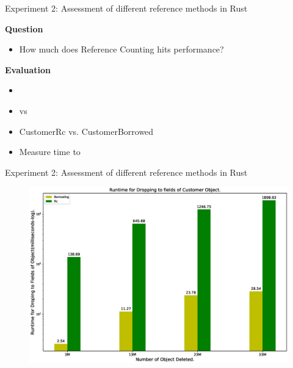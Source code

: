 \documentclass[9pt]{beamer}
\begin{document}

\begin{frame}[fragile]{Experiment 2: Assessment of different reference methods in Rust}

    \textbf{Question}
    \begin{itemize}
        \item How much does Reference Counting hits performance?
    \end{itemize}

    \vspace{0.5cm}

    \textbf{Evaluation}
    \begin{itemize}
        \item {}
        \item {} vs 
        \item CustomerRc vs. CustomerBorrowed
        \item Measure time to 
    \end{itemize}

\end{frame}



\begin{frame}[fragile]{Experiment 2: Assessment of different reference methods in Rust}

    \begin{figure}[hp]
        \centering
        \begin{center}
                \includegraphics[width=1\textwidth]{images/rust_droptime_borring_rc.eps}
                \captionsetup{labelformat=empty}
        \end{center}
    \end{figure}
\end{frame}
\end{document}
